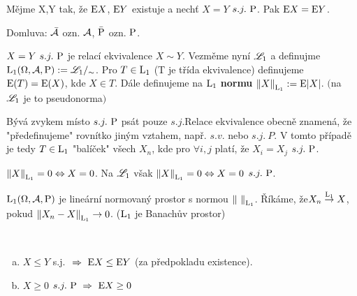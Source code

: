\begin{theorem}
	Mějme X,Y tak, že $\mathrm{E} X$, $\mathrm{E} Y$ existuje a nechť $X=Y$ $s.j.~\mathrm{P}$. Pak $\mathrm{E} X=\mathrm{E} Y$.
\end{theorem}
\begin{remark}
	Domluva: $\bar{\mathcal{A}}$ ozn. $\mathcal{A}$, $\bar{\mathrm{P}}$ ozn. $\mathrm{P}$.
\end{remark}
\begin{define}
	$X=Y~ s.j.~\mathrm{P}$ je relací ekvivalence $X\sim Y$. Vezměme nyní $\mathscr{L}_1$ a definujme $\mathrm{L}_1(\Omega,\mathcal{A},\mathrm{P}):=\mathscr{L}_1 /_\sim$. Pro $T\in \mathrm{L}_1$ (T je třída ekvivalence) definujeme $\mathrm{E} (T)=\mathrm{E} (X)$, kde $X\in T$. Dále definujeme na $\mathrm{L}_1$ \textbf{normu} $\left\|X\right\|_{\mathrm{L}_1}:=\mathrm{E} |X|$. $($na $\mathscr{L}_1$ je to pseudonorma$)$
\end{define}
\begin{remark}
	Bývá zvykem místo $s.j.~\mathrm{P}$ psát pouze $s.j.$\newline Relace ekvivalence obecně znamená, že "předefinujeme" rovnítko jiným vztahem, např. $s.v.$ nebo $s.j.~P$. V tomto případě je tedy $T\in \mathrm{L}_1$ "balíček" všech $X_n$, kde pro $\forall i,j$ platí, že $X_i=X_j$ $s.j.~\mathrm{P}$.
\end{remark}
\begin{remark}
	$\left\|X\right\|_{\mathrm{L}_1}=0\Leftrightarrow X=0$. Na $\mathscr{L}_1$ však $\left\|X\right\|_{\mathrm{L}_1}=0\Leftrightarrow X=0$ $s.j.~\mathrm{P}$.
\end{remark}
\begin{define}
	$\mathrm{L}_1(\Omega,\mathcal{A},\mathrm{P})$ je lineární normovaný prostor s normou $\left\|~\right\|_{\mathrm{L}_1}$. Říkáme, že\newline $X_n\stackrel{\mathrm{L}_1}{\to}X$, pokud $\left\|X_n-X\right\|_{\mathrm{L}_1}\to 0$. ($\mathrm{L}_1$ je Banachův prostor)
\end{define}
\begin{theorem}~
	\begin{enumerate}[a)]
		\item 	$X\leq Y$ s.j. $~\Rightarrow~ \mathrm{E} X\leq \mathrm{E} Y$ (za předpokladu existence).
		\item $X\geq 0$ $s.j.~\mathrm{P}~\Rightarrow~ \mathrm{E} X\geq 0$
	\end{enumerate}
\end{theorem}
